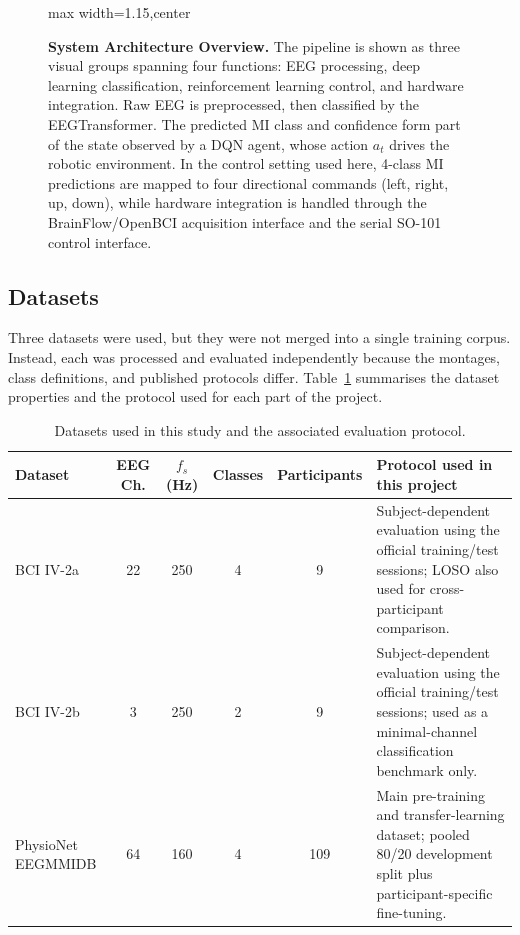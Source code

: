 \documentclass[12pt, a4paper]{article}
\begin{document}
\begin{figure}[htbp]
\begin{adjustbox}{max width=1.15\textwidth,center}
    \end{adjustbox}
    \caption{\textbf{System Architecture Overview.} The pipeline is shown as three visual groups spanning four functions: EEG processing, deep learning classification, reinforcement learning control, and hardware integration. Raw EEG is preprocessed, then classified by the EEGTransformer. The predicted MI class and confidence form part of the state observed by a DQN agent, whose action $a_t$ drives the robotic environment. In the control setting used here, 4-class MI predictions are mapped to four directional commands (left, right, up, down), while hardware integration is handled through the BrainFlow/OpenBCI acquisition interface and the serial SO-101 control interface.}
    \label{fig:system_overview}
\end{figure}

\subsection{Datasets}

Three datasets were used, but they were not merged into a single training corpus. Instead, each was processed and evaluated independently because the montages, class definitions, and published protocols differ. Table~\ref{tab:datasets_v10} summarises the dataset properties and the protocol used for each part of the project.

\begin{table}[htbp]
\centering
\caption{Datasets used in this study and the associated evaluation protocol.}
\label{tab:datasets_v10}
\begin{tabular}{@{} >{\raggedright\arraybackslash}p{2.5cm} c c c c >{\raggedright\arraybackslash}p{4.3cm} @{}}
\toprule
\textbf{Dataset} & \textbf{EEG Ch.} & \textbf{$f_s$ (Hz)} & \textbf{Classes} & \textbf{Participants} & \textbf{Protocol used in this project} \\
\midrule
BCI IV-2a & 22 & 250 & 4 & 9 & Subject-dependent evaluation using the official training/test sessions; LOSO also used for cross-participant comparison. \\
BCI IV-2b & 3 & 250 & 2 & 9 & Subject-dependent evaluation using the official training/test sessions; used as a minimal-channel classification benchmark only. \\
PhysioNet EEGMMIDB & 64 & 160 & 4 & 109 & Main pre-training and transfer-learning dataset; pooled 80/20 development split plus participant-specific fine-tuning. \\
\bottomrule
\end{tabular}
\end{table}
\end{document}
